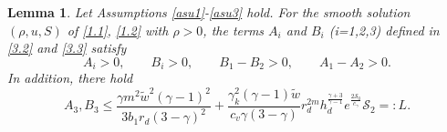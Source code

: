 \documentclass[11pt,reqno]{article}
\newtheorem{lem}{Lemma}[section]
\newcommand{\fr}{\frac}
\numberwithin{equation}{section}
\begin{document}
\begin{lem}\label{lem4}
Let Assumptions \ref{asu1}-\ref{asu3} hold. For the smooth solution $(\rho, u, S)$ of \eqref{1.1}, \eqref{1.2} with $\rho>0$, the terms $A_i$ and $B_i$ (i=1,2,3) defined in \eqref{3.2} and \eqref{3.3} satisfy
\begin{equation}\label{4.13}
A_i > 0, \qquad  B_i > 0,\qquad B_1-B_2>0,\qquad A_1-A_2>0.
\end{equation}
In addition, there hold
\begin{equation}\label{a3}
A_3,B_3\leq \fr{\gamma m^2\tilde{w}^2(\gamma-1)^2}{3b_1r_d(3-\gamma)^2} +\fr{\gamma_{k}^2(\gamma-1)\tilde{w}}{c_v\gamma(3-\gamma)}r_{d}^{2m}h_{d}^{\fr{\gamma+3}{\gamma-1}} e^{\fr{2\mathcal{S}_0}{c_\gamma}}\mathcal{S}_2=:L.
\end{equation}
\end{lem}
\end{document}
